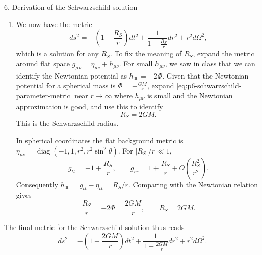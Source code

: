 \documentclass[11pt]{article}
\begin{document}
\begin{problem}{6. Derivation of the Schwarzschild solution}
\begin{enumerate}[label=(\alph*)]
          \begin{proof}
            With \(B=1/A\), the remaining components simplify to
            \begin{equation}
              \label{eq:p6-remaining-ricci}
              R_{tt}=\frac A2\left(A''+\frac{2A'}r\right),\qquad
              R_{rr}=-\frac1{2A}\left(A''+\frac{2A'}r\right).
            \end{equation}
            For \(A=1-R_S/r\), we have \(A'=R_S/r^2\) and \(A''=-2R_S/r^3\), so the parentheses vanish. Together with \(R_{\theta\theta}=0\), \(R_{\phi\phi}=\sin^2\theta R_{\theta\theta}=0\), and the vanishing off-diagonal components, this proves \(R_{\mu\nu}=0\), hence \(G_{\mu\nu}=0\).
          \end{proof}
		\item We now have the metric
		      \begin{equation}
			      \label{eq:p6-schwarzschild-parameter-metric}
			      ds^2=-\left(1-\frac{R_S}r\right)dt^2+\frac{1}{1-\frac{R_S}r}dr^2+r^2d\Omega^2,
		      \end{equation}
		      which is a solution for any \(R_S\).
		      To fix the meaning of \(R_S\), expand the metric around flat space \(g_{\mu\nu}=\eta_{\mu\nu}+h_{\mu\nu}\).
		      For small \(h_{\mu\nu}\), we saw in class that we can identify the Newtonian potential as \(h_{00}=-2\Phi\).
		      Given that the Newtonian potential for a spherical mass is \(\Phi=-\frac{GM}r\), expand \cref{eq:p6-schwarzschild-parameter-metric} near \(r\to\infty\) where \(h_{\mu\nu}\) is small and the Newtonian approximation is good, and use this to identify
		      \begin{equation}
			      \label{eq:p6-schwarzschild-radius}
			      R_S=2GM.
		      \end{equation}
		      This is the Schwarzschild radius.

          \begin{answer}
            In spherical coordinates the flat background metric is
            \(\eta_{\mu\nu}=\operatorname{diag}(-1,1,r^2,r^2\sin^2\theta)\).
            For \(|R_S|/r\ll1\),
            \begin{equation}
              \label{eq:p6-weak-field}
              g_{tt}=-1+\frac{R_S}{r},\qquad
              g_{rr}=1+\frac{R_S}{r}+O\!\left(\frac{R_S^2}{r^2}\right).
            \end{equation}
            Consequently \(h_{00}=g_{tt}-\eta_{tt}=R_S/r\). Comparing with the Newtonian relation gives
            \begin{equation}
              \label{eq:p6-mass-identification}
              \frac{R_S}{r}=-2\Phi=\frac{2GM}{r},\qquad R_S=2GM.
            \end{equation}
          \end{answer}
	\end{enumerate}
	The final metric for the Schwarzschild solution thus reads
	\begin{equation}
		\label{eq:p6-schwarzschild-metric}
		ds^2=-\left(1-\frac{2GM}r\right)dt^2+\frac{1}{1-\frac{2GM}r}dr^2+r^2d\Omega^2.
	\end{equation}
\end{problem}
\end{document}
